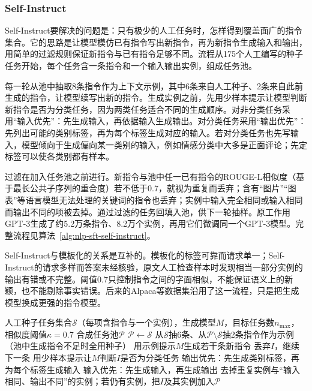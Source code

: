 \subsubsection{Self-Instruct}
\label{sec:nlp-sft-self-instruct}

Self-Instruct要解决的问题是：只有极少的人工任务时，怎样得到覆盖面广的指令集合。它的思路是让模型模仿已有指令写出新指令，再为新指令生成输入和输出，用简单的过滤规则保证新指令与已有指令足够不同。流程从175个人工编写的种子任务开始，每个任务含一条指令和一个输入输出实例，组成任务池。

每一轮从池中抽取8条指令作为上下文示例，其中6条来自人工种子、2条来自此前生成的指令，让模型续写出新的指令。生成实例之前，先用少样本提示让模型判断新指令是否为分类任务，因为两类任务适合不同的生成顺序。对非分类任务采用“输入优先”：先生成输入，再依据输入生成输出。对分类任务采用“输出优先”：先列出可能的类别标签，再为每个标签生成对应的输入。若对分类任务也先写输入，模型倾向于生成偏向某一类别的输入，例如情感分类中大多是正面评论；先定标签可以使各类别都有样本。

过滤在加入任务池之前进行。新指令与池中任一已有指令的ROUGE-L相似度（基于最长公共子序列的重合度\cite{lin-2004-rouge}）若不低于0.7，就视为重复而丢弃；含有“图片”“图表”等语言模型无法处理的关键词的指令也丢弃；实例中输入完全相同或输入相同而输出不同的项被去掉。通过过滤的任务回填入池，供下一轮抽样。原工作用GPT-3生成了约5.2万条指令、8.2万个实例，再用它们微调同一个GPT-3模型。完整流程见算法~\ref{alg:nlp-sft-self-instruct}。

Self-Instruct与模板化的关系是互补的。模板化的标签可靠而请求单一；Self-Instruct的请求多样而答案未经核验，原文人工检查样本时发现相当一部分实例的输出有错或不完整。阈值0.7只控制指令之间的字面相似，不能保证语义上的新颖，也不能剔除事实错误。后来的Alpaca等数据集沿用了这一流程，只是把生成模型换成更强的指令模型。

\begin{algorithm}
  \label{alg:nlp-sft-self-instruct}
  \begin{algorithmic}[1]
    \Require 人工种子任务集合$\mathcal S$（每项含指令与一个实例），生成模型$M$，目标任务数$n_{\max}$，相似度阈值$\kappa=0.7$
    \Ensure 合成任务池$\mathcal P$
    \State $\mathcal P\gets\mathcal S$
      \State 从$\mathcal S$抽6条、从$\mathcal P\setminus\mathcal S$抽2条指令作为示例（池中生成指令不足时全用种子）
      \State 用示例提示$M$生成若干条新指令
          \State 丢弃$I$，继续下一条
        \EndIf
        \State 用少样本提示让$M$判断$I$是否为分类任务
          \State 输出优先：先生成类别标签，再为每个标签生成输入
        \Else
          \State 输入优先：先生成输入，再生成输出
        \EndIf
        \State 去掉重复实例与“输入相同、输出不同”的实例；若仍有实例，把$I$及其实例加入$\mathcal P$
      \EndFor
    \EndWhile
  \end{algorithmic}
\end{algorithm}

